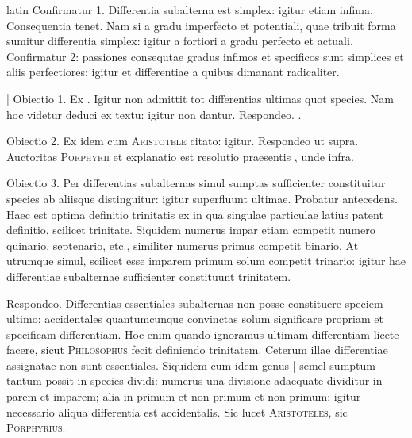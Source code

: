 \begin{otherlanguage*}{latin}
\pstart
 Confirmatur 1. Differentia subalterna est simplex: igitur etiam infima. Consequentia tenet. Nam si a gradu imperfecto et potentiali, quae tribuit forma sumitur differentia simplex: igitur a fortiori a gradu perfecto et actuali. Confirmatur 2: passiones consequtae gradus infimos et specificos sunt simplices et aliis perfectiores: igitur et differentiae a quibus dimanant radicaliter. 
\pend

\pstart
 \textnormal{|}   Obiectio 1. Ex . Igitur non admittit tot differentias ultimas quot species. Nam hoc videtur deduci ex textu: igitur non dantur. Respondeo. . 
\pend

\pstart
 Obiectio 2. Ex  idem cum \textsc{Aristotele} citato: igitur. Respondeo ut supra. Auctoritas \textsc{Porphyrii} et explanatio est resolutio praesentis , unde infra. 
\pend

\pstart
 Obiectio 3. Per differentias subalternas simul sumptas sufficienter constituitur species ab aliisque distinguitur: igitur superfluunt ultimae. Probatur antecedens. Haec est optima definitio trinitatis ex  in qua singulae particulae latius patent definitio, scilicet trinitate. Siquidem numerus impar etiam competit numero quinario, septenario, etc., similiter numerus primus competit binario. At utrumque simul, scilicet esse imparem primum solum competit trinario: igitur hae differentiae subalternae sufficienter constituunt trinitatem. 
\pend

\pstart
 Respondeo. Differentias essentiales subalternas non posse constituere speciem ultimo; accidentales quantumcunque convinctas solum significare propriam et specificam differentiam. Hoc enim quando ignoramus ultimam differentiam licete facere, sicut \textsc{Philosophus} fecit definiendo trinitatem. Ceterum illae differentiae assignatae non sunt essentiales. Siquidem cum idem genus \textnormal{|} semel sumptum tantum possit in species dividi: numerus una divisione adaequate dividitur in parem  et imparem; alia in primum et non primum et non primum: igitur necessario aliqua differentia est accidentalis. Sic lucet \textsc{Aristoteles}, sic \textsc{Porphyrius}\index[persons]{}. 
\pend


\end{otherlanguage*}
